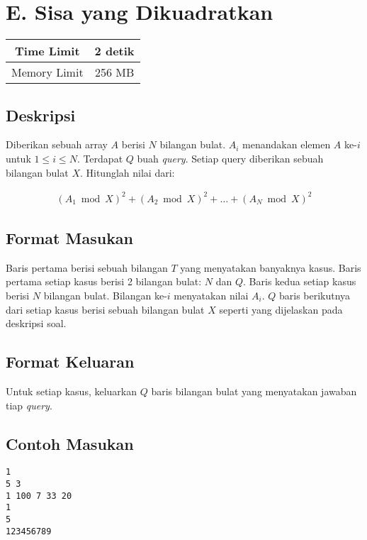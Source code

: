 \documentclass{article}
\begin{document}
\section*{\hfil E. Sisa yang Dikuadratkan\hfil}

\begin{center}
\begin{tabular}{ |cc| } 
 \hline
 Time Limit & 2 detik \\ 
 \hline
 Memory Limit & 256 MB \\
 \hline
\end{tabular}
\end{center}

\subsection*{Deskripsi}
Diberikan sebuah array $A$ berisi $N$ bilangan bulat. $A_{i}$ menandakan elemen $A$ ke-$i$ untuk $1 \leq i \leq N$. Terdapat $Q$ buah \textit{query}. Setiap query diberikan sebuah bilangan bulat $X$. Hitunglah nilai dari:

\begin{gather*} 
(A_{1} \bmod X)^2 + (A_{2} \bmod X)^2 + \dots + (A_{N} \bmod X)^2
\end{gather*} 

\subsection*{Format Masukan}
\par Baris pertama berisi sebuah bilangan $T$ yang menyatakan banyaknya kasus.
\newline Baris pertama setiap kasus berisi 2 bilangan bulat: $N$ dan $Q$.
\newline Baris kedua setiap kasus berisi $N$ bilangan bulat. Bilangan ke-$i$ menyatakan nilai $A_{i}$.
\newline $Q$ baris berikutnya dari setiap kasus berisi sebuah bilangan bulat $X$ seperti yang dijelaskan pada deskripsi soal.

\subsection*{Format Keluaran}

\par Untuk setiap kasus, keluarkan $Q$ baris bilangan bulat yang menyatakan jawaban tiap \textit{query}.

\subsection*{Contoh Masukan}
\begin{lstlisting}
1
5 3
1 100 7 33 20
1
5
123456789
\end{lstlisting}
\end{document}
